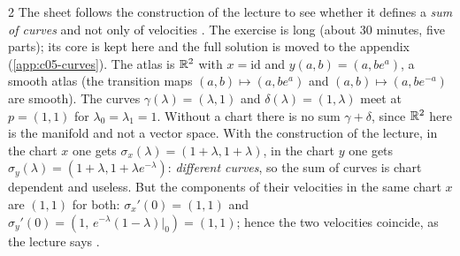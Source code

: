 \begin{paracol}{2}
The sheet follows the construction of the lecture to see whether it defines a \emph{sum of curves} and not only of velocities . The exercise is long (about 30 minutes, five parts); its core is kept here and the full solution is moved to the appendix (\cref{app:c05-curves}).
The atlas is $\mathbb{R}^2$ with $x=\mathrm{id}$ and $y(a,b)=(a,be^a)$, a smooth atlas (the transition maps $(a,b)\mapsto(a,be^a)$ and $(a,b)\mapsto(a,be^{-a})$ are smooth). The curves $\gamma(\lambda)=(\lambda,1)$ and $\delta(\lambda)=(1,\lambda)$ meet at $p=(1,1)$ for $\lambda_0=\lambda_1=1$.
Without a chart there is no sum $\gamma+\delta$, since $\mathbb{R}^2$ here is the manifold and not a vector space. With the construction of the lecture, in the chart $x$ one gets $\sigma_x(\lambda)=(1+\lambda,1+\lambda)$, in the chart $y$ one gets $\sigma_y(\lambda)=(1+\lambda,1+\lambda e^{-\lambda})$: \emph{different curves}, so the sum of curves is chart dependent and useless. But the components of their velocities in the same chart $x$ are
$(1,1)$ for both: $\sigma_x'(0)=(1,1)$ and $\sigma_y'(0)=(1,\,e^{-\lambda}(1-\lambda)|_0)=(1,1)$; hence the two velocities coincide, as the lecture says .


\end{paracol}
